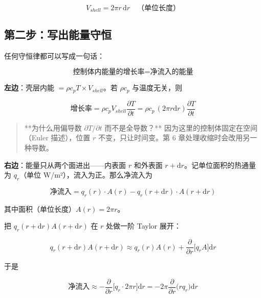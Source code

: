 \begin{equation*}
\boxed{V_{shell}=2\pi r\,\mathrm{d} r}\quad\text{（单位长度）}
\end{equation*}


\subsection{第二步：写出能量守恒}


任何守恒律都可以写成一句话：


\begin{equation*}
\text{控制体内能量的增长率}=\text{净流入的能量}
\end{equation*}


\textbf{左边}：壳层内能 $=\rho c_p T\times V_{shell}$。若 $\rho c_p$ 与温度无关，则


\begin{equation*}
\text{增长率}=\rho c_p V_{shell}\frac{\partial T}{\partial t}=\rho c_p\,(2\pi r\mathrm{d} r)\frac{\partial T}{\partial t}
\end{equation*}


\begin{quote}
**为什么用偏导数 $\partial T/\partial t$ 而不是全导数？** 因为这里的控制体固定在空间（Euler 描述），位置 $r$ 不变，只让时间变。第 6 章处理收缩时会改用另一种导数。
\end{quote}


\textbf{右边}：能量只从两个面进出——内表面 $r$ 和外表面 $r+\mathrm{d} r$。记单位面积的热通量为 $q_r$（单位 W/m²），流入为正。那么净流入为


\begin{equation*}
\text{净流入}=q_r(r)\cdot A(r)-q_r(r+\mathrm{d} r)\cdot A(r+\mathrm{d} r)
\end{equation*}


其中面积（单位长度）$A(r)=2\pi r$。


把 $q_r(r+\mathrm{d} r)A(r+\mathrm{d} r)$ 在 $r$ 处做一阶 Taylor 展开：


\begin{equation*}
q_r(r+\mathrm{d} r)A(r+\mathrm{d} r)\approx q_r(r)A(r)+\frac{\partial}{\partial r}\big[q_rA\big]\mathrm{d} r
\end{equation*}


于是


\begin{equation*}
\text{净流入}\approx-\frac{\partial}{\partial r}\big[q_r\cdot2\pi r\big]\mathrm{d} r=-2\pi\frac{\partial}{\partial r}\big(rq_r\big)\mathrm{d} r
\end{equation*}


